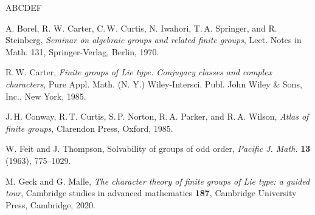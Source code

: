 \documentclass[12pt]{amsart}
\theoremstyle{definition}
\numberwithin{equation}{section}
\begin{document}

\begin{thebibliography}{ABCDEF}

A. Borel, R. W. Carter, C.\,W. Curtis, N. Iwahori, T.\,A. Springer,
and R. Steinberg, \emph{Seminar on algebraic groups and related
finite groups}, Lect. Notes in Math. 131, Springer-Verlag, Berlin,
1970.

R.\,W. %
Carter, \emph{Finite groups of Lie type. Conjugacy classes
and complex characters}, Pure %
Appl. Math. (N. Y.) Wiley-Intersci.
Publ. John Wiley \& Sons, Inc., New York, 1985.

  J.\,H. Conway, R.\,T. Curtis, S.\,P. Norton, R.\,A. Parker, and R.\,A. Wilson,
 {\it Atlas %
of finite groups}, Clarendon %
Press, Oxford, 1985.


W. Feit and J. %
Thompson, Solvability of groups of odd order,
\emph{Pacific J. Math.} \textbf{13} %
(1963), 775--1029.





M. Geck and G. Malle, {\it The character theory of finite groups of
Lie %
type: a guided %
tour}, Cambridge studies in advanced mathematics
\textbf{187}, Cambridge University Press, Cambridge, 2020.


\end{thebibliography}
\end{document}
